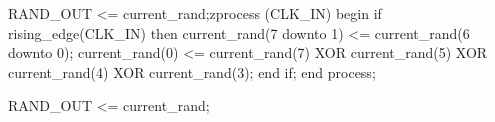   RAND_OUT <= current_rand;zprocess (CLK_IN)
  begin
      if rising_edge(CLK_IN) then
          current_rand(7 downto 1) <= current_rand(6 downto 0);
          current_rand(0) <= current_rand(7) XOR current_rand(5) XOR current_rand(4) XOR current_rand(3);
      end if;
  end process;

  RAND_OUT <= current_rand;
  